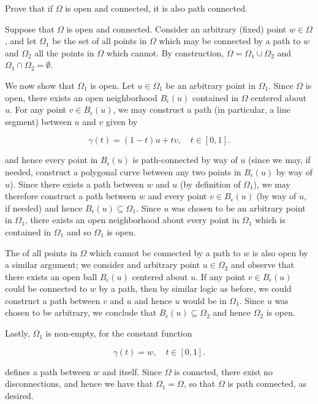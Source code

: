 Prove that if $\Omega$ is open and connected, it is also path connected.

\begin{solution}
    Suppose that $\Omega$ is open and connected. Consider an arbitrary (fixed) point $w \in \Omega$, and let $\Omega_1$
    be the set of all points in $\Omega$ which may be connected by a path to $w$ and $\Omega_2$ all the points in 
    $\Omega$ which cannot. By construction, $\Omega = \Omega_1 \cup \Omega_2$ and $\Omega_1 \cap \Omega_2 = \emptyset$.
    
    We now show that $\Omega_1$ is open. Let $u \in \Omega_1$ be an arbitrary point in 
    $\Omega_1$. Since $\Omega$ is open, there exists an open neighborhood $B_{\epsilon}(u)$ contained in $\Omega$ 
    centered about $u$. For any point $v \in B_{\epsilon}(u)$, we may construct a path (in particular, a line segment) 
    between $u$ and $v$ given by

    $$
        \gamma(t) = (1-t)u + tv, \quad t \in [0,1].
    $$  

    and hence every point in $B_{\epsilon}(u)$ is path-connected by way of $u$ (since we may, if needed, construct a 
    polygonal curve between any two points in $B_{\epsilon}(u)$ by way of $u$). Since there exists a path between $w$ 
    and $u$ (by definition of $\Omega_1$), we may therefore construct a path between $w$ and every point 
    $v \in B_{\epsilon}(u)$ (by way of $u$, if needed) and hence $B_{\epsilon}(u) \subseteq \Omega_1$. Since $u$ was 
    chosen to be an arbitrary point in $\Omega_1$, there exists an open neighborhood about every point in $\Omega_1$
    which is contained in $\Omega_1$ and so $\Omega_1$ is open.

    The of all points in $\Omega$ which cannot be connected by a path to $w$ is also open by a similar argument; we
    consider and arbitrary point $u \in \Omega_2$ and observe that there exists an open ball $B_{\epsilon}(u)$ centered
    about $u$. If any point $v \in B_{\epsilon}(u)$ could be connected to $w$ by a path, then by similar logic as 
    before, we could construct a path between $v$ and $u$ and hence $u$ would be in $\Omega_1$. Since $u$ was chosen to
    be arbitrary, we conclude that $B_{\epsilon}(u) \subseteq \Omega_2$ and hence $\Omega_2$ is open.

    Lastly, $\Omega_1$ is non-empty, for the constant function
    
    $$
        \gamma(t) = w, \quad t \in [0,1].
    $$

    defines a path between $w$ and itself. Since $\Omega$ is conncted, there exist no disconnections, and hence we have
    that $\Omega_1 = \Omega$, so that $\Omega$ is path connected, as desired.
    \ \\
\end{solution}